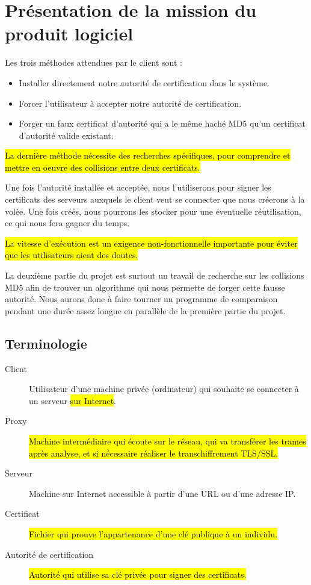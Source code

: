 \documentclass[a4paper,11pt,french]{article}
\begin{document}
\newpage
\section{Présentation de la mission du produit logiciel}




Les trois méthodes attendues par le client sont :
\begin{itemize}
\item Installer directement notre autorité de certification dans le système.
\item Forcer l'utilisateur à accepter notre autorité de certification.
\item Forger un faux certificat d'autorité qui a le même haché MD5 qu'un certificat d'autorité valide existant.
\end{itemize}

\hl{La dernière méthode nécessite des recherches spécifiques, pour comprendre et mettre en oeuvre des collisions entre deux certificats.}


Une fois l'autorité installée et acceptée, nous l'utiliserons pour signer les certificats des serveurs auxquels le client veut se connecter que nous créerons à la volée. Une fois créés, nous pourrons les stocker pour une éventuelle réutilisation, ce qui nous fera gagner du temps.


\hl{La vitesse d'exécution est un exigence non-fonctionnelle importante pour éviter que les utilisateurs aient des doutes.}

La deuxième partie du projet est surtout un travail de recherche sur les collisions MD5 afin de trouver un algorithme qui nous permette de forger cette fausse autorité. Nous aurons donc à faire tourner un programme de comparaison pendant une durée assez longue en parallèle de la première partie du projet.

\subsection{Terminologie}

\begin{description}
\item[Client] Utilisateur d'une machine privée (ordinateur) qui souhaite se connecter à un serveur \hl{sur Internet}.
\item[Proxy] \hl{Machine intermédiaire qui écoute sur le réseau, qui va transférer les trames après analyse, et si nécessaire réaliser le transchiffrement TLS/SSL.}
\item[Serveur] Machine sur Internet accessible à partir d'une URL ou d'une adresse IP.
\item[Certificat] \hl{Fichier qui prouve l'appartenance d'une clé publique à un individu.}
\item[Autorité de certification] \hl{Autorité qui utilise sa clé privée pour signer des certificats.}

\end{description}
\end{document}
